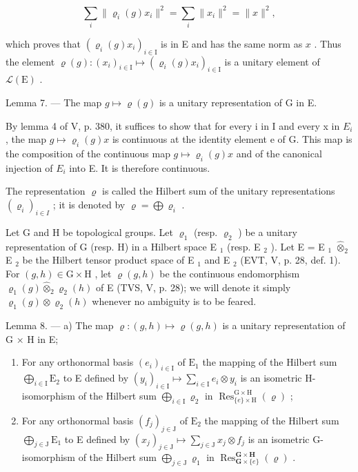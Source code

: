\[
\sum_ {i} \| \varrho_ {i} (g) x _ {i} \| ^ {2} = \sum_ {i} \| x _ {i} \| ^ {2} = \| x \| ^ {2},
\]

which proves that \((\varrho_i(g)x_i)_{i\in \mathrm{I}}\) is in E and has the same norm as \(x\) . Thus the element \(\varrho (g)\colon (x_{i})_{i\in \mathrm{I}}\mapsto (\varrho_{i}(g)x_{i})_{i\in \mathrm{I}}\) is a unitary element of \(\mathcal{L}(\mathrm{E})\) .

Lemma 7. --- The map \(g \mapsto \varrho(g)\) is a unitary representation of G in E.

By lemma 4 of V, p. 380, it suffices to show that for every i in I and every x in \(E_{i}\) , the map \(g \mapsto \varrho_{i}(g)x\) is continuous at the identity element e of G. This map is the composition of the continuous map \(g \mapsto \varrho_{i}(g)x\) and of the canonical injection of \(E_{i}\) into E. It is therefore continuous.

The representation \(\varrho\) is called the Hilbert sum of the unitary representations \((\varrho_{i})_{i\in I}\) ; it is denoted by \(\varrho = \bigoplus \varrho_{i}\) .

Let G and H be topological groups. Let \(\varrho_{1}\) (resp. \(\varrho_{2}\) ) be a unitary representation of G (resp. H) in a Hilbert space E \(_{1}\) (resp. E \(_{2}\) ). Let E = E \(_{1}\) \(\widehat{\otimes}_{2}\) E \(_{2}\) be the Hilbert tensor product space of E \(_{1}\) and E \(_{2}\) (EVT, V, p. 28, def. 1). For \((g,h)\in\mathrm{G}\times\mathrm{H}\) , let \(\varrho(g,h)\) be the continuous endomorphism \(\varrho_{1}(g)\widehat{\otimes}_{2}\varrho_{2}(h)\) of E (TVS, V, p. 28); we will denote it simply \(\varrho_{1}(g)\otimes\varrho_{2}(h)\) whenever no ambiguity is to be feared.

Lemma 8. --- a) The map \(\varrho\colon(g,h)\mapsto\varrho(g,h)\) is a unitary representation of G × H in E;

\begin{enumerate}
\def\labelenumi{\alph{enumi})}
\setcounter{enumi}{1}
\item
  For any orthonormal basis \((e_i)_{i\in \mathrm{I}}\) of \(\mathrm{E}_1\) the mapping of the Hilbert sum \(\bigoplus_{i\in \mathrm{I}}\mathrm{E}_2\) to E defined by \((y_i)_{i\in \mathrm{I}}\mapsto \sum_{i\in \mathrm{I}}e_i\otimes y_i\) is an isometric H-isomorphism of the Hilbert sum \(\bigoplus_{i\in \mathrm{I}}\varrho_2\) in \(\operatorname {Res}_{\{e\} \times \mathrm{H}}^{\mathrm{G}\times \mathrm{H}}(\varrho)\) ;
\item
  For any orthonormal basis \((f_j)_{j\in \mathrm{J}}\) of \(\mathrm{E}_2\) the mapping of the Hilbert sum \(\bigoplus_{j\in \mathrm{J}}\mathrm{E}_1\) to E defined by \((x_{j})_{j\in \mathrm{J}}\mapsto \sum_{j\in \mathrm{J}}x_{j}\otimes f_{j}\) is an isometric G-isomorphism of the Hilbert sum \(\bigoplus_{j\in \mathrm{J}}\varrho_1\) in \(\operatorname {Res}_{\mathbf{G}\times \{e\}}^{\mathbf{G}\times \mathbf{H}}(\varrho)\) .
\end{enumerate}

